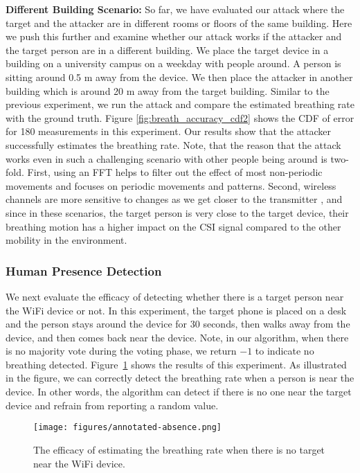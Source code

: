 \vspace{0.05in}\noindent\textbf{Different Building Scenario:}
So far, we have evaluated our attack where the target and the attacker are in different rooms or floors of the same building. Here we push this further and examine whether our attack works if the attacker and the target person are in a different building.  We place the target device in a building on a university campus on a weekday with people around. A person is sitting around 0.5 m away from the device.  We then place the attacker in another building which is around 20 m away from the target building.  Similar to the previous experiment, we run the attack and compare the estimated breathing rate with the ground truth. Figure \ref{fig:breath_accuracy_cdf2} shows the CDF of error for 180 measurements in this experiment. Our results show that the attacker successfully estimates the breathing rate. Note, that the reason that the attack works even in such a challenging scenario with other people being around is two-fold. First, using an FFT helps to filter out the effect of most non-periodic movements and focuses on periodic movements and patterns. Second, wireless channels are more sensitive to changes as we get closer to the transmitter \cite{abedi2020witag,dehbashi2021verification}, and since in these scenarios, the target person is very close to the target device, their breathing motion has a higher impact on the CSI signal compared to the other mobility in the environment. 

\subsubsection{Human Presence Detection}
We next evaluate the efficacy of detecting whether there is a target person near the WiFi device or not. In this experiment, the target phone is placed on a desk and the person stays around the device for $30$ seconds, then walks away from the device, and then comes back near the device. Note, in our algorithm, when there is no majority vote during the voting phase, we return $-1$ to indicate no breathing detected. Figure~\ref{fig:absence} shows the results of this experiment. As illustrated in the figure, we can correctly detect the breathing rate when a person is near the device. In other words, the algorithm can detect if there is no one near the target device and refrain from reporting a random value.

\begin{figure}[!t]
    \centering
    \texttt{[image: figures/annotated-absence.png]}
    \caption{The efficacy of estimating the breathing rate when there is no target near the WiFi device.}
    \label{fig:absence}
\end{figure}

